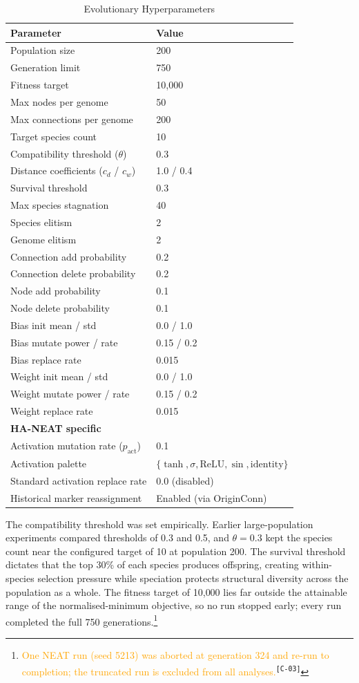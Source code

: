 \documentclass[12pt]{article}
\newcommand{\revID}[1]{\textsuperscript{\scriptsize\texttt{[#1]}}}
\newcommand{\revWeak}[2]{\textcolor{orange}{#2}\revID{#1}}    %
\begin{document}
\begin{table}[h]
\centering
\caption{Evolutionary Hyperparameters}
\label{tab:hyperparameters}
\begin{tabular}{ll}
\toprule
\textbf{Parameter} & \textbf{Value} \\
\midrule
Population size & 200 \\
Generation limit & 750 \\
Fitness target & 10{,}000 \\
Max nodes per genome & 50 \\
Max connections per genome & 200 \\
Target species count & 10 \\
Compatibility threshold ($\theta$) & 0.3 \\
Distance coefficients ($c_d$ / $c_w$) & 1.0 / 0.4 \\
Survival threshold & 0.3 \\
Max species stagnation & 40 \\
Species elitism & 2 \\
Genome elitism & 2 \\
Connection add probability & 0.2 \\
Connection delete probability & 0.2 \\
Node add probability & 0.1 \\
Node delete probability & 0.1 \\
Bias init mean / std & 0.0 / 1.0 \\
Bias mutate power / rate & 0.15 / 0.2 \\
Bias replace rate & 0.015 \\
Weight init mean / std & 0.0 / 1.0 \\
Weight mutate power / rate & 0.15 / 0.2 \\
Weight replace rate & 0.015 \\
\midrule
\textbf{HA-NEAT specific} & \\
Activation mutation rate ($p_{\text{act}}$) & 0.1 \\
Activation palette & $\{\tanh, \sigma, \text{ReLU}, \sin, \text{identity}\}$ \\
Standard activation replace rate & 0.0 (disabled) \\
Historical marker reassignment & Enabled (via OriginConn) \\
\bottomrule
\end{tabular}
\end{table}

The compatibility threshold was set empirically.
Earlier large-population experiments compared thresholds of 0.3 and 0.5, and $\theta = 0.3$ kept the species count near the configured target of 10 at population 200.
The survival threshold dictates that the top 30\% of each species produces offspring, creating within-species selection pressure while speciation protects structural diversity across the population as a whole.
The fitness target of 10{,}000 lies far outside the attainable range of the normalised-minimum objective, so no run stopped early; every run completed the full 750 generations.\footnote{\revWeak{C-03}{One NEAT run (seed 5213) was aborted at generation 324 and re-run to completion; the truncated run is excluded from all analyses.}}
\end{document}
